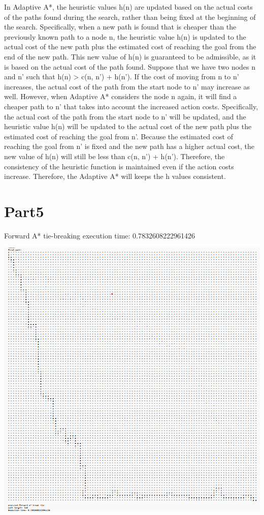\documentclass[12pt, letterpaper]{article}
\begin{document}
In Adaptive A*, the heuristic values h(n) are updated based on the actual costs of the paths found during the search, rather than being fixed at the beginning of the search. Specifically, when a new path is found that is cheaper than the previously known path to a node n, the heuristic value h(n) is updated to the actual cost of the new path plus the estimated cost of reaching the goal from the end of the new path. This new value of h(n) is guaranteed to be admissible, as it is based on the actual cost of the path found. Suppose that we have two nodes n and n' such that h(n) > c(n, n') + h(n'). If the cost of moving from n to n' increases, the actual cost of the path from the start node to n' may increase as well. However, when Adaptive A* considers the node n again, it will find a cheaper path to n' that takes into account the increased action costs. Specifically, the actual cost of the path from the start node to n' will be updated, and the heuristic value h(n) will be updated to the actual cost of the new path plus the estimated cost of reaching the goal from n'. Because the estimated cost of reaching the goal from n' is fixed and the new path has a higher actual cost, the new value of h(n) will still be less than c(n, n') + h(n'). Therefore, the consistency of the heuristic function is maintained even if the action costs increase. Therefore, the Adaptive A* will keeps the h values consistent.

\section{Part5}

Forward A* tie-breaking execution time: 0.7832608222961426

\includegraphics[width=\textwidth,height=\textheight]{part5a.png}
\end{document}
